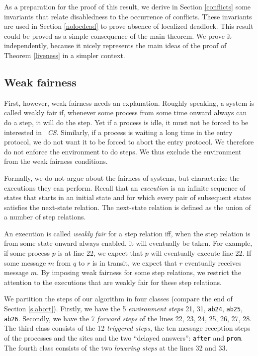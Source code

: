 \documentclass[10pt]{article} \usepackage[english]{babel}
\def\S #1/{\mbox {\textsl{#1}}}
\def\T #1/{\mbox {\texttt{#1}}}
\begin{document}
As a preparation for the proof of this result, we derive in Section
\ref{conflicts} some invariants that relate disabledness to the
occurrence of conflicts.  These invariants are used in Section
\ref{nolocdead} to prove absence of localized deadlock.  This result
could be proved as a simple consequence of the main theorem.  We prove
it independently, because it nicely represents the main ideas of the
proof of Theorem \ref{liveness} in a simpler context.

\subsection{Weak fairness} \label{intro-wf}

First, however, weak fairness needs an explanation.  Roughly speaking,
a system is called weakly fair if, whenever some process from some
time onward always can do a step, it will do the step.  Yet if a
process is idle, it must not be forced to be interested in \S
CS/. Similarly, if a process is waiting a long time in the entry
protocol, we do not want it to be forced to abort the entry
protocol. We therefore do not enforce the environment to do steps.  We
thus exclude the environment from the weak fairness conditions.

Formally, we do not argue about the fairness of systems, but
characterize the executions they can perform. Recall that an
\emph{execution} is an infinite sequence of states that starts in an
initial state and for which every pair of subsequent states satisfies
the next-state relation.  The next-state relation is defined as the
union of a number of step relations.  

An execution is called \emph{weakly fair} for a step relation iff,
when the step relation is from some state onward always enabled,
it will eventually be taken.  For example, if some process $p$ is at
line 22, we expect that $p$ will eventually execute line 22.  If some
message $m$ from $q$ to $r$ is in transit, we expect that $r$
eventually receives message $m$.  By imposing weak fairness for some
step relations, we restrict the attention to the executions that are
weakly fair for these step relations.

We partition the steps of our algorithm in four classes (compare the
end of Section \ref{s.abort}).  Firstly, we have the 5
\emph{environment steps} 21, 31, \T ab24/, \T ab25/, \T
ab26/. Secondly, we have the 7 \emph{forward steps} of the lines 22,
23, 24, 25, 26, 27, 28. The third class consists of the 12
\emph{triggered steps}, the ten message reception steps of the
processes and the sites and the two ``delayed answers'': \T after/ and
\T prom/.  The fourth class consists of the two \emph{lowering
  steps} at the lines 32 and 33.
\end{document}
